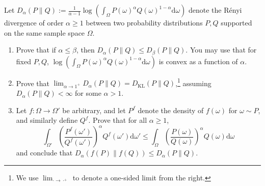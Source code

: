 Let $D_\alpha(P \| Q) := \frac{1}{\alpha - 1} \log(\int_\Omega P(\omega)^\alpha Q(\omega)^{1-\alpha} \mathrm{d}\omega)$ denote the R\'enyi divergence of order $\alpha \geq 1$ between two probability distributions $P, Q$ supported on the same sample space $\Omega$.

\begin{enumerate}
    \item[(i)] Prove that if $\alpha \leq \beta$, then $D_\alpha(P \| Q) \leq D_\beta(P \| Q)$. You may use that for fixed $P, Q$, $\log(\int_\Omega P(\omega)^\alpha Q(\omega)^{1-\alpha} \mathrm{d}\omega)$ is convex as a function of $\alpha$.
    \item[(ii)] Prove that $\lim_{\alpha \to 1^+} D_\alpha(P \| Q) = D_{\mathrm{KL}}(P \| Q)$,\footnote{We use $\lim_{\cdot \to \cdot^+}$ to denote a one-sided limit from the right.} assuming $D_\alpha(P \| Q) < \infty$ for some $\alpha > 1$.
    \item[(iii)] Let $f : \Omega \to \Omega'$ be arbitrary, and let $P^f$ denote the density of $f(\omega)$ for $\omega \sim P$, and similarly define $Q^f$. Prove that for all $\alpha \geq 1$,
    \[
    \int_{\Omega'} \left( \frac{P^f(\omega')}{Q^f(\omega')} \right)^\alpha Q^f(\omega') \mathrm{d}\omega' \leq \int_\Omega \left( \frac{P(\omega)}{Q(\omega)} \right)^\alpha Q(\omega) \mathrm{d}\omega
    \]
    and conclude that $D_\alpha(f(P) \| f(Q)) \leq D_\alpha(P \| Q)$.
\end{enumerate}
